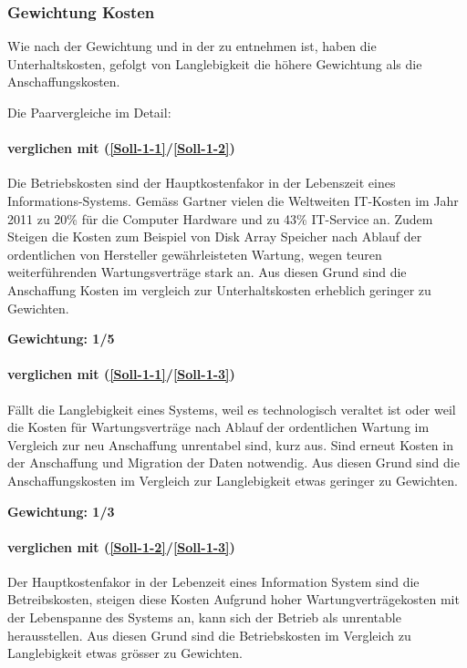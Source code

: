 \subsubsection{Gewichtung Kosten}

Wie nach der Gewichtung und in der  zu entnehmen ist, haben die Unterhaltskosten, gefolgt von Langlebigkeit die höhere Gewichtung als die Anschaffungskosten.

Die Paarvergleiche im Detail:

\paragraph*{ verglichen mit  (\ref{Soll-1-1}/\ref{Soll-1-2})}
Die Betriebskosten sind der Hauptkostenfakor in der Lebenszeit eines Informations-Systems. Gemäss Gartner vielen die Weltweiten IT-Kosten im Jahr 2011 zu 20\% für die Computer Hardware und zu 43\% IT-Service an. Zudem Steigen die Kosten zum Beispiel von Disk Array Speicher nach Ablauf der ordentlichen von Hersteller gewährleisteten Wartung, wegen teuren weiterführenden Wartungsverträge stark an.
Aus diesen Grund sind die Anschaffung Kosten im vergleich zur Unterhaltskosten erheblich geringer zu Gewichten.

\textbf{Gewichtung: 1/5}

\paragraph*{ verglichen mit  (\ref{Soll-1-1}/\ref{Soll-1-3})}
Fällt die Langlebigkeit eines Systems, weil es technologisch veraltet ist oder weil die Kosten für Wartungsverträge nach Ablauf der ordentlichen Wartung im Vergleich zur neu Anschaffung unrentabel sind, kurz aus. Sind erneut Kosten in der Anschaffung und Migration der Daten notwendig. Aus diesen Grund sind die Anschaffungskosten im Vergleich zur Langlebigkeit etwas geringer zu Gewichten.

\textbf{Gewichtung: 1/3}


\paragraph*{ verglichen mit  (\ref{Soll-1-2}/\ref{Soll-1-3})}
Der Hauptkostenfakor in der Lebenzeit eines Information System sind die Betreibskosten, steigen diese Kosten Aufgrund hoher Wartungverträgekosten mit der Lebenspanne des Systems an, kann sich der Betrieb als unrentable herausstellen. Aus diesen Grund sind die Betriebskosten im Vergleich zu Langlebigkeit etwas grösser zu Gewichten.

